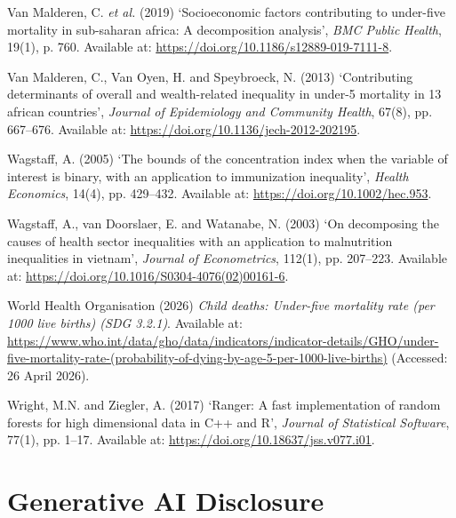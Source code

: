 \documentclass[
  11pt,
  a4paper,
]{article}
\newlength{\cslhangindent}
\newenvironment{CSLReferences}[2] %
 {\begin{list}{}{%
  \setlength{\itemindent}{0pt}
  \setlength{\leftmargin}{0pt}
  \setlength{\parsep}{0pt}
  \ifodd #1
   \setlength{\leftmargin}{\cslhangindent}
   \setlength{\itemindent}{-1\cslhangindent}
  \fi
  \setlength{\itemsep}{#2\baselineskip}}}
 {\end{list}}
\begin{document}
\begin{CSLReferences}{0}{1}
Van Malderen, C. \emph{et al.} (2019) {`Socioeconomic factors
contributing to under-five mortality in sub-saharan africa: A
decomposition analysis'}, \emph{BMC Public Health}, 19(1), p. 760.
Available at: \url{https://doi.org/10.1186/s12889-019-7111-8}.

Van Malderen, C., Van Oyen, H. and Speybroeck, N. (2013) {`Contributing
determinants of overall and wealth-related inequality in under-5
mortality in 13 african countries'}, \emph{Journal of Epidemiology and
Community Health}, 67(8), pp. 667--676. Available at:
\url{https://doi.org/10.1136/jech-2012-202195}.

Wagstaff, A. (2005) {`The bounds of the concentration index when the
variable of interest is binary, with an application to immunization
inequality'}, \emph{Health Economics}, 14(4), pp. 429--432. Available
at: \url{https://doi.org/10.1002/hec.953}.

{Wagstaff, A., van Doorslaer, E. and Watanabe, N.} (2003) {`On
decomposing the causes of health sector inequalities with an application
to malnutrition inequalities in vietnam'}, \emph{Journal of
Econometrics}, 112(1), pp. 207--223. Available at:
\url{https://doi.org/10.1016/S0304-4076(02)00161-6}.

World Health Organisation (2026) \emph{Child deaths: Under-five
mortality rate (per 1000 live births) (SDG 3.2.1)}. Available at:
\url{https://www.who.int/data/gho/data/indicators/indicator-details/GHO/under-five-mortality-rate-(probability-of-dying-by-age-5-per-1000-live-births)}
(Accessed: 26 April 2026).

Wright, M.N. and Ziegler, A. (2017) {`Ranger: A fast implementation of
random forests for high dimensional data in {C++} and {R}'},
\emph{Journal of Statistical Software}, 77(1), pp. 1--17. Available at:
\url{https://doi.org/10.18637/jss.v077.i01}.

\end{CSLReferences}

\section{Generative AI Disclosure}\label{generative-ai-disclosure}
\end{document}
